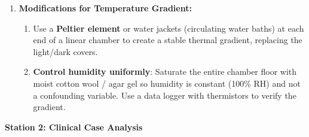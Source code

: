\documentclass[11pt]{article}
\begin{document}
\begin{enumerate}
    \item \textbf{Modifications for Temperature Gradient:}
    \begin{enumerate}
        \item Use a \textbf{Peltier element} or water jackets (circulating water baths) at each end of a linear chamber to create a stable thermal gradient, replacing the light/dark covers.
        \item \textbf{Control humidity uniformly}: Saturate the entire chamber floor with moist cotton wool / agar gel so humidity is constant (100\% RH) and not a confounding variable. Use a data logger with thermistors to verify the gradient.
    \end{enumerate}
\end{enumerate}

\textbf{Station 2: Clinical Case Analysis}
\end{document}
